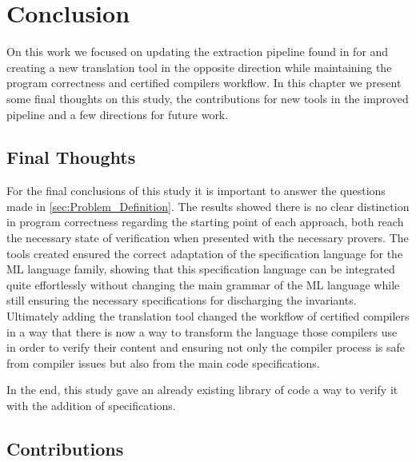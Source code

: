 
%

\chapter{Conclusion}
\label{cha:Conclusion}

On this work we focused on updating the extraction pipeline found in \whyml for \cml and creating a new translation tool in the opposite
direction while maintaining the program correctness and certified compilers workflow. In this chapter we present some final thoughts on this study,
the contributions for new tools in the improved pipeline and a few directions for future work.

\section{Final Thoughts}

For the final conclusions of this study it is important to answer the questions made in \ref{sec:Problem_Definition}. The results showed there is no clear
distinction in program correctness regarding the starting point of each approach, both reach the necessary state of verification when presented with
the necessary provers. The tools created ensured the correct adaptation of the \gospel specification language for the ML language family, showing that
this specification language can be integrated quite effortlessly without changing the main grammar of the ML language while still ensuring the necessary
specifications for discharging the invariants. Ultimately adding the translation tool changed the workflow of certified compilers in a way that there is now
a way to transform the language those compilers use in order to verify their content and ensuring not only the compiler process is safe from compiler
issues but also from the main code specifications.

In the end, this study gave an already existing library of \cml code a way to verify it with the addition of \gospel specifications.

\section{Contributions}

